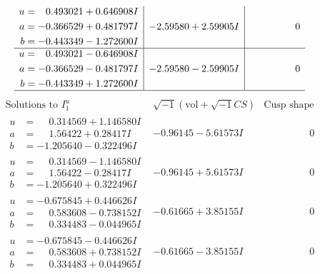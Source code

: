 \documentclass[1p]{elsarticle_modified}
\theoremstyle{definition}
\newcommand{\I}{\sqrt{-1}}
\begin{document}
$$\begin{array}{c|c|c}
\begin{aligned}
u &= \phantom{-}0.493021 + 0.646908 I \\
a &= -0.366529 + 0.481797 I \\
b &= -0.443349 - 1.272600 I\end{aligned}
 & -2.59580 + 2.59905 I & \phantom{-0.000000 } 0 \\ \hline\begin{aligned}
u &= \phantom{-}0.493021 - 0.646908 I \\
a &= -0.366529 - 0.481797 I \\
b &= -0.443349 + 1.272600 I\end{aligned}
 & -2.59580 - 2.59905 I & \phantom{-0.000000 } 0\\
 \hline 
 \end{array}$$\newpage$$\begin{array}{c|c|c}  
\text{Solutions to }I^u_{1}& \I (\text{vol} + \sqrt{-1}CS) & \text{Cusp shape}\\
 \hline 
\begin{aligned}
u &= \phantom{-}0.314569 + 1.146580 I \\
a &= \phantom{-}1.56422 + 0.28417 I \\
b &= -1.205640 - 0.322496 I\end{aligned}
 & -0.96145 - 5.61573 I & \phantom{-0.000000 } 0 \\ \hline\begin{aligned}
u &= \phantom{-}0.314569 - 1.146580 I \\
a &= \phantom{-}1.56422 - 0.28417 I \\
b &= -1.205640 + 0.322496 I\end{aligned}
 & -0.96145 + 5.61573 I & \phantom{-0.000000 } 0 \\ \hline\begin{aligned}
u &= -0.675845 + 0.446626 I \\
a &= \phantom{-}0.583608 - 0.738152 I \\
b &= \phantom{-}0.334483 - 0.044965 I\end{aligned}
 & -0.61665 + 3.85155 I & \phantom{-0.000000 } 0 \\ \hline\begin{aligned}
u &= -0.675845 - 0.446626 I \\
a &= \phantom{-}0.583608 + 0.738152 I \\
b &= \phantom{-}0.334483 + 0.044965 I\end{aligned}
 & -0.61665 - 3.85155 I & \phantom{-0.000000 } 0 \\ \hline\begin{aligned}

\end{aligned}
\end{array}$$
\end{document}
